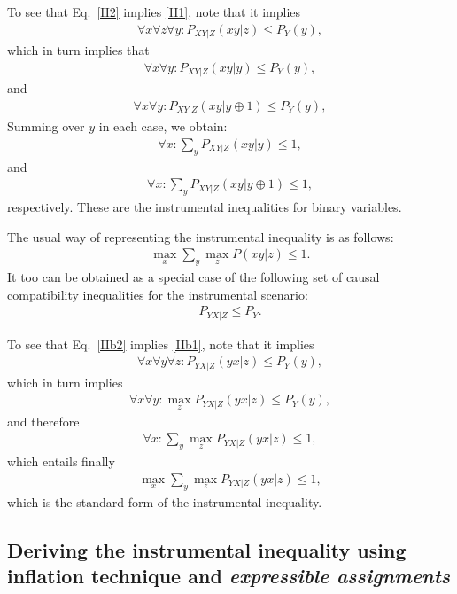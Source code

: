 \documentclass[aps,english,superscriptaddress,onecolumn,twoside,longbibliography,pra,floatfix,fleqn,nofootinbib]{revtex4-1}%
\theoremstyle{definition}
\begin{document}
To see that Eq.~\eqref{II2} implies \eqref{II1}, note that it implies 
\begin{align}
\forall x \forall z \forall y:  P_{XY|Z}(xy|z) \le P_Y(y),
\end{align}
which in turn implies that
\begin{align}
\forall x  \forall y:  P_{XY|Z}(xy|y) \le P_Y(y),
\end{align}
and 
\begin{align}
\forall x  \forall y:  P_{XY|Z}(xy|y\oplus 1) \le P_Y(y),
\end{align}
Summing over $y$ in each case, we obtain:
\begin{align}
\forall x : \sum_y  P_{XY|Z}(xy|y) \le 1,
\end{align}
and 
\begin{align}
\forall x : \sum_y  P_{XY|Z}(xy|y\oplus 1) \le 1,
\end{align}
respectively.  
These are the  instrumental inequalities for binary variables.  


The usual way of representing the instrumental inequality is as follows:
\begin{align}
\max_x \sum_y \max_z P(xy|z) \le 1.
\label{IIb1}
\end{align}
It too can be obtained as a special case of the following set of causal compatibility inequalities for the instrumental scenario:
\begin{align}
P_{YX|Z} \le P_Y.
\label{IIb2}
\end{align}

To see that Eq.~\eqref{IIb2} implies \eqref{IIb1}, note that it implies 
\begin{align}
\forall x \forall y \forall z: P_{YX|Z}(yx|z) \le P_Y (y),
\end{align}
which in turn implies 
\begin{align}
\forall x \forall y :\max_z P_{YX|Z}(yx|z) \le P_Y (y),
\end{align}
and therefore
\begin{align}
\forall x : \sum_y \max_z P_{YX|Z}(yx|z) \le 1,
\end{align}
which entails finally 
\begin{align}
\max_x \sum_y \max_z P_{YX|Z}(yx|z) \le 1,
\end{align}
which is the standard form of the instrumental inequality.

\subsection{Deriving the instrumental inequality using inflation technique and {\em expressible assignments}}
\end{document}
